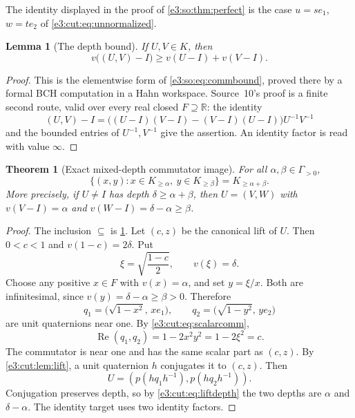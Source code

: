 \documentclass[11pt,letterpaper]{article}
\numberwithin{equation}{section}
\newtheorem{theorem}{Theorem}[section]
\newtheorem{lemma}[lemma]{Lemma}
\theoremstyle{definition}
\theoremstyle{remark}
\newcommand{\R}{\mathbb R}
\newcommand{\re}{\operatorname{Re}}
\newcommand{\comm}[2]{\left(#1,#2\right)}
\newcommand{\commset}[2]{\{\comm{x}{y}:x\in #1,\ y\in #2\}}
\begin{document}
The identity displayed in the proof of \cref{e3:so:thm:perfect} is the case
$u=se_1$, $w=te_2$ of \cref{e3:cut:eq:unnormalized}.

\begin{lemma}[The depth bound]\label{e3:cut:lem:bound}
If $U,V\in K$, then
\begin{equation}\label{e3:cut:eq:commbound}
 v\bigl(\comm UV-I\bigr)\ge v(U-I)+v(V-I).
\end{equation}
\end{lemma}
\begin{proof}
This is the elementwise form of \cref{e3:so:eq:commbound}, proved there by a
formal BCH computation in a Hahn workspace. Source~10's proof is a finite
second route, valid over every real closed $F\supseteq\R$: the identity
\[
 \comm UV-I=\bigl((U-I)(V-I)-(V-I)(U-I)\bigr)U^{-1}V^{-1}
\]
and the bounded entries of $U^{-1},V^{-1}$ give the assertion. An identity
factor is read with value $\infty$.
\end{proof}

\begin{theorem}[Exact mixed-depth commutator image]\label{e3:cut:thm:mixed}
For all $\alpha,\beta\in\Gamma_{>0}$,
\begin{equation}\label{e3:cut:eq:mixed}
 \commset{K_{\ge\alpha}}{K_{\ge\beta}}=K_{\ge\alpha+\beta}.
\end{equation}
More precisely, if $U\ne I$ has depth $\delta\ge\alpha+\beta$, then
$U=\comm VW$ with $v(V-I)=\alpha$ and $v(W-I)=\delta-\alpha\ge\beta$.
\end{theorem}
\begin{proof}
The inclusion $\subseteq$ is \cref{e3:cut:lem:bound}. Let $(c,z)$ be the
canonical lift of $U$. Then $0<c<1$ and $v(1-c)=2\delta$. Put
\[
 \xi=\sqrt{\frac{1-c}{2}},\qquad v(\xi)=\delta.
\]
Choose any positive $x\in F$ with $v(x)=\alpha$, and set $y=\xi/x$. Both are
infinitesimal, since $v(y)=\delta-\alpha\ge\beta>0$. Therefore
\[
 q_1=\bigl(\sqrt{1-x^2},\,xe_1\bigr),\qquad
 q_2=\bigl(\sqrt{1-y^2},\,ye_2\bigr)
\]
are unit quaternions near one. By \cref{e3:cut:eq:scalarcomm},
\[
 \re\comm{q_1}{q_2}=1-2x^2y^2=1-2\xi^2=c.
\]
The commutator is near one and has the same scalar part as $(c,z)$. By
\cref{e3:cut:lem:lift}, a unit quaternion $h$ conjugates it to $(c,z)$. Then
\[
 U=\comm{p(hq_1h^{-1})}{p(hq_2h^{-1})}.
\]
Conjugation preserves depth, so by \cref{e3:cut:eq:liftdepth} the two depths
are $\alpha$ and $\delta-\alpha$. The identity target uses two identity
factors.
\end{proof}
\end{document}
